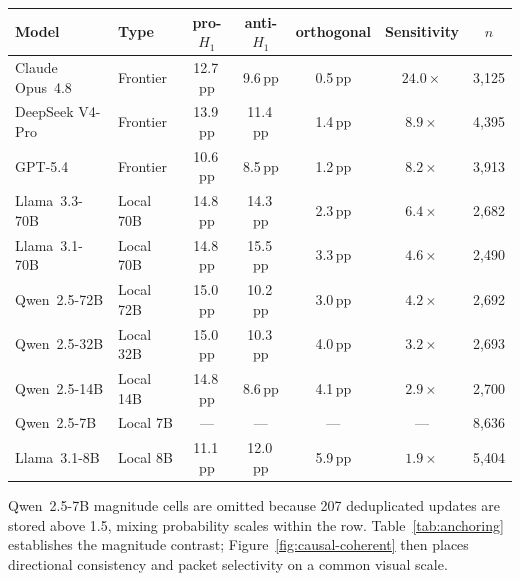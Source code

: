 \begin{center}
\begin{minipage}{\linewidth}
\centering
{}
\label{tab:anchoring}
\small
\begin{tabular}{llccccc}
\toprule
\textbf{Model} & \textbf{Type} & pro-$H_1$ & anti-$H_1$ & orthogonal
  & \textbf{Sensitivity} & $n$ \\
\midrule
Claude Opus~4.8 & Frontier  & 12.7\,pp & 9.6\,pp  & 0.5\,pp & $24.0\times$ & 3{,}125 \\
DeepSeek V4-Pro & Frontier  & 13.9\,pp & 11.4\,pp & 1.4\,pp & $8.9\times$  & 4{,}395 \\
GPT-5.4         & Frontier  & 10.6\,pp & 8.5\,pp  & 1.2\,pp & $8.2\times$  & 3{,}913 \\
\midrule
Llama~3.3-70B   & Local 70B & 14.8\,pp & 14.3\,pp & 2.3\,pp & $6.4\times$  & 2{,}682 \\
Llama~3.1-70B   & Local 70B & 14.8\,pp & 15.5\,pp & 3.3\,pp & $4.6\times$  & 2{,}490 \\
Qwen~2.5-72B    & Local 72B & 15.0\,pp & 10.2\,pp & 3.0\,pp & $4.2\times$  & 2{,}692 \\
Qwen~2.5-32B    & Local 32B & 15.0\,pp & 10.3\,pp & 4.0\,pp & $3.2\times$  & 2{,}693 \\
Qwen~2.5-14B    & Local 14B & 14.8\,pp &  8.6\,pp & 4.1\,pp & $2.9\times$  & 2{,}700 \\
Qwen~2.5-7B     & Local 7B  & --- & --- & --- & --- & 8{,}636 \\
Llama~3.1-8B    & Local 8B  & 11.1\,pp & 12.0\,pp & 5.9\,pp & $1.9\times$ & 5{,}404 \\
\bottomrule
\end{tabular}
\end{minipage}
\end{center}
Qwen~2.5-7B magnitude cells are omitted because 207 deduplicated updates are
stored above 1.5, mixing probability scales within the row.
Table~\ref{tab:anchoring} establishes the magnitude contrast; Figure~\ref{fig:causal-coherent} then places directional consistency and packet selectivity on a common visual scale.

